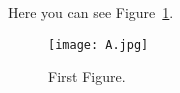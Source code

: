 \documentclass[10pt]{article}
\begin{document}
\listoffigures


Here you can see Figure~\ref{firstfig}.
\par %
\begin{figure}[h]
  \centering
  \texttt{[image: A.jpg]}
  \caption{First Figure.} 
  \label{firstfig}
\end{figure}
\end{document}
